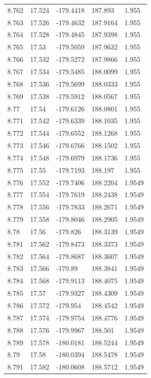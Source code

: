 \begin{tabular}{lllll}
8.762 & 17.524 & -179.4418 & 187.893 & 1.955 \\
8.763 & 17.526 & -179.4632 & 187.9164 & 1.955 \\
8.764 & 17.528 & -179.4845 & 187.9398 & 1.955 \\
8.765 & 17.53 & -179.5059 & 187.9632 & 1.955 \\
8.766 & 17.532 & -179.5272 & 187.9866 & 1.955 \\
8.767 & 17.534 & -179.5485 & 188.0099 & 1.955 \\
8.768 & 17.536 & -179.5699 & 188.0333 & 1.955 \\
8.769 & 17.538 & -179.5912 & 188.0567 & 1.955 \\
8.77 & 17.54 & -179.6126 & 188.0801 & 1.955 \\
8.771 & 17.542 & -179.6339 & 188.1035 & 1.955 \\
8.772 & 17.544 & -179.6552 & 188.1268 & 1.955 \\
8.773 & 17.546 & -179.6766 & 188.1502 & 1.955 \\
8.774 & 17.548 & -179.6979 & 188.1736 & 1.955 \\
8.775 & 17.55 & -179.7193 & 188.197 & 1.955 \\
8.776 & 17.552 & -179.7406 & 188.2204 & 1.9549 \\
8.777 & 17.554 & -179.7619 & 188.2438 & 1.9549 \\
8.778 & 17.556 & -179.7833 & 188.2671 & 1.9549 \\
8.779 & 17.558 & -179.8046 & 188.2905 & 1.9549 \\
8.78 & 17.56 & -179.826 & 188.3139 & 1.9549 \\
8.781 & 17.562 & -179.8473 & 188.3373 & 1.9549 \\
8.782 & 17.564 & -179.8687 & 188.3607 & 1.9549 \\
8.783 & 17.566 & -179.89 & 188.3841 & 1.9549 \\
8.784 & 17.568 & -179.9113 & 188.4075 & 1.9549 \\
8.785 & 17.57 & -179.9327 & 188.4309 & 1.9549 \\
8.786 & 17.572 & -179.954 & 188.4542 & 1.9549 \\
8.787 & 17.574 & -179.9754 & 188.4776 & 1.9549 \\
8.788 & 17.576 & -179.9967 & 188.501 & 1.9549 \\
8.789 & 17.578 & -180.0181 & 188.5244 & 1.9549 \\
8.79 & 17.58 & -180.0394 & 188.5478 & 1.9549 \\
8.791 & 17.582 & -180.0608 & 188.5712 & 1.9549 \\

\end{tabular}
